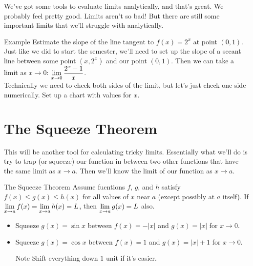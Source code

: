 We've got some tools to evaluate limits analytically, and that's great. We probably feel pretty good. Limits aren't so bad! But there are still some important limits that we'll struggle with analytically.

\begin{note}{Example}
Estimate the slope of the line tangent to $f(x) = 2^x$ at point $(0,1)$.\\

Just like we did to start the semester, we'll need to set up the slope of a secant line between some point $(x, 2^x)$ and our point $(0,1)$. Then we can take a limit as $x\to0$: $\displaystyle \lim_{x\to0} \dfrac{2^x-1}{x}$.\\

Technically we need to check both sides of the limit, but let's just check one side numerically. Set up a chart with values for $x$.
\end{note}

\section*{The Squeeze Theorem}

This will be another tool for calculating tricky limits. Essentially what we'll do is try to trap (or squeeze) our function in between two other functions that have the same limit as $x\to a$. Then we'll know the limit of our function as $x \to a$.

\begin{thm}{The Squeeze Theorem}
Assume fucntions $f$, $g$, and $h$ satisfy $f(x) \leq g(x) \leq h(x)$ for all values of $x$ near $a$ (except possibly at $a$ itself). If $\displaystyle \lim_{x\to a} f(x) = \displaystyle \lim_{x\to a} h(x) = L$, then $\displaystyle \lim_{x\to a} g(x) = L$ also.
\end{thm}

\begin{itemize}
\item Squeeze $g(x) = \sin x$ between $f(x) =-|x|$ and $g(x) = |x|$ for $x\to 0$.
\item Squeeze $g(x) = \cos x$ between $f(x) =1$ and $g(x) = |x|+1$ for $x\to 0$.
\begin{note}{Note}
Shift everything down 1 unit if it's easier.
\end{note}
\end{itemize}

